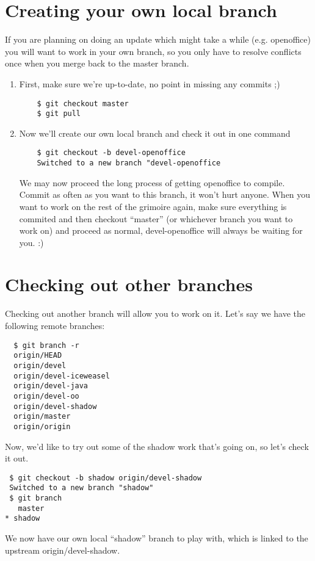 \documentclass[a4paper,10pt]{book}
\begin{document}
\section{Creating your own local branch}
If you are planning on doing an update which might take a while (e.g.
openoffice) you will want to work in your own branch, so you only have to
resolve conflicts once when you merge back to the master branch.
\begin{enumerate}
	\item First, make sure we're up-to-date, no point in missing any
commits ;)
\begin{verbatim}
	$ git checkout master
	$ git pull
\end{verbatim}
	\item Now we'll create our own local branch and check it out in one
command
\begin{verbatim}
	$ git checkout -b devel-openoffice
	Switched to a new branch "devel-openoffice
\end{verbatim}
We may now proceed the long process of getting openoffice to compile. Commit
as often as you want to this branch, it won't hurt anyone. When you want to
work on the rest of the grimoire again, make sure everything is commited and
then checkout ``master'' (or whichever branch you want to work on) and proceed
as normal, devel-openoffice will always be waiting for you. :)

\end{enumerate}

\section{Checking out other branches}
Checking out another branch will allow you to work on it. Let's say we have
the following remote branches:
\begin{verbatim}
  $ git branch -r
  origin/HEAD
  origin/devel
  origin/devel-iceweasel
  origin/devel-java
  origin/devel-oo
  origin/devel-shadow
  origin/master
  origin/origin
\end{verbatim}
Now, we'd like to try out some of the shadow work that's going on, so let's
check it out.
\begin{verbatim}
 $ git checkout -b shadow origin/devel-shadow
 Switched to a new branch "shadow"
 $ git branch
   master
* shadow
\end{verbatim}
We now have our own local ``shadow'' branch to play with, which is linked to
the upstream origin/devel-shadow.
\end{document}
